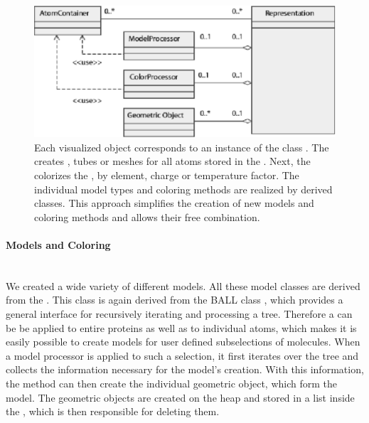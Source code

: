 \begin{figure}[ht] %
\centering
\includegraphics[width=1.\textwidth]{representation}
\caption[UML diagram for the  class]
{Each visualized object corresponds to an instance of the class 
. The  creates 
, \eg tubes or meshes for all atoms stored in the
. Next, the  colorizes the 
, \eg by element, charge or temperature factor. The
individual model types and coloring methods are realized by derived classes.
This approach simplifies the creation of new models and coloring methods and 
allows their free combination.}
\label{fig:representation}
\end{figure}

\paragraph{Models and Coloring}
\hspace*{\fill}\\
We created a wide variety of different models. All these model classes are 
derived from the . This class is again derived from 
the BALL class , which provides a 
general interface for recursively iterating and processing a  
tree. Therefore a  can be be applied to entire 
proteins as well as to individual atoms, which makes it is easily possible to 
create models for user defined subselections of molecules. When a model 
processor is applied to such a selection, it first iterates over the 
 tree and collects the information necessary for the model's 
creation. With this information, the method 
 can then create the individual geometric 
object, which form the model. The geometric objects are created on the heap 
and stored in a list inside the , which is then 
responsible for deleting them.

